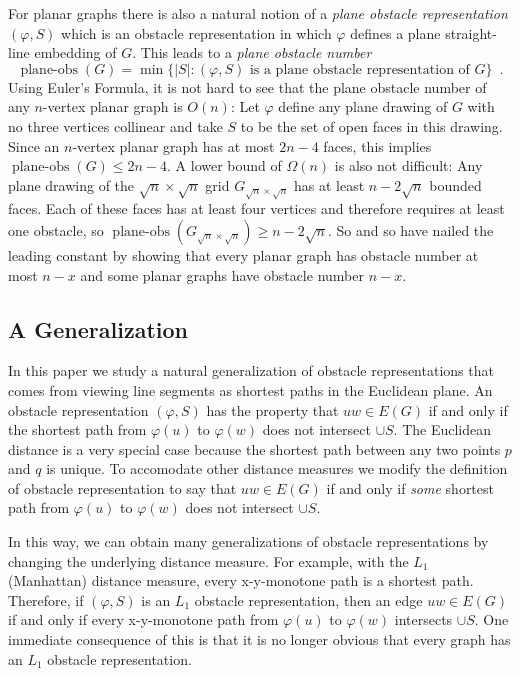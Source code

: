 \documentclass{patmorin}
\DeclareMathOperator{\planeobs}{plane-obs}
\begin{document}
For planar graphs there is also a natural notion of a \emph{plane obstacle
representation} $(\varphi, S)$ which is an obstacle representation
in which $\varphi$ defines a plane straight-line embedding of $G$.
This leads to a \emph{plane obstacle number}
\[
    \planeobs(G) = \min\{|S| :\text{$(\varphi, S)$ is a plane obstacle
        representation of $G$}\} \enspace .
\]
Using Euler's Formula, it is not hard to see that the plane obstacle
number of any $n$-vertex planar graph is $O(n)$: Let $\varphi$ define
any plane drawing of $G$ with no three vertices collinear and take $S$
to be the set of open faces in this drawing.  Since an $n$-vertex planar
graph has at most $2n-4$ faces, this implies $\planeobs(G)\le 2n-4$.
A lower bound of $\Omega(n)$ is also not difficult:  Any plane drawing
of the $\sqrt{n}\times\sqrt{n}$ grid $G_{\sqrt{n}\times\sqrt{n}}$
has at least $n-2\sqrt{n}$ bounded faces. Each of these faces has
at least four vertices and therefore requires at least one obstacle,
so $\planeobs(G_{\sqrt{n}\times\sqrt{n}})\ge n-2\sqrt{n}$.  So and so
\cite{X} have nailed the leading constant by showing that every planar
graph has obstacle number at most $n-x$ and some planar graphs have
obstacle number $n-x$.

\subsection{A Generalization}

In this paper we study a natural generalization of obstacle
representations that comes from viewing line segments as shortest paths
in the Euclidean plane.  An obstacle representation $(\varphi,S)$ has
the property that $uw\in E(G)$ if and only if the shortest path from
$\varphi(u)$ to $\varphi(w)$ does not intersect $\cup S$.  The Euclidean
distance is a very special case because the shortest path between any two
points $p$ and $q$ is unique. To accomodate other distance measures we
modify the definition of obstacle representation to say that $uw\in E(G)$
if and only if \emph{some} shortest path from $\varphi(u)$ to $\varphi(w)$
does not intersect $\cup S$.

In this way, we can obtain many generalizations of obstacle
representations by changing the underlying distance measure.  For example,
with the $L_1$ (Manhattan) distance measure, every x-y-monotone
path is a shortest path.  Therefore, if $(\varphi,S)$ is an $L_1$
obstacle representation, then an edge $uw\in E(G)$ if and only if every
x-y-monotone path from $\varphi(u)$ to $\varphi(w)$ intersects $\cup S$.  One
immediate consequence of this is that it is
no longer obvious that every graph has an $L_1$ obstacle representation.
\end{document}
